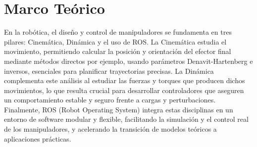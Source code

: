\chapter{Marco Teórico} 
\label{chap:marco_teorico}

En la robótica, el diseño y control de manipuladores se fundamenta en tres pilares: Cinemática, Dinámica y el uso de ROS. La Cinemática estudia el movimiento, permitiendo calcular la posición y orientación del efector final mediante métodos directos por ejemplo, usando parámetros Denavit-Hartenberg e inversos, esenciales para planificar trayectorias precisas. La Dinámica complementa este análisis al estudiar las fuerzas y torques que producen dichos movimientos, lo que resulta crucial para desarrollar controladores que aseguren un comportamiento estable y seguro frente a cargas y perturbaciones. Finalmente, ROS (Robot Operating System) integra estas disciplinas en un entorno de software modular y flexible, facilitando la simulación y el control real de los manipuladores, y acelerando la transición de modelos teóricos a aplicaciones prácticas.